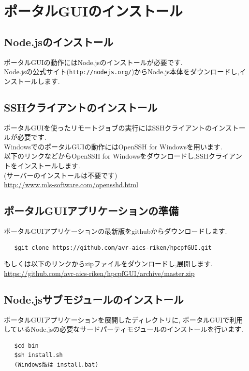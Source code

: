 \documentclass[a4paper,10pt,oneside]{jsbook}
\begin{document}
\section{ポータルGUIのインストール}

\subsection{Node.jsのインストール}
ポータルGUIの動作にはNode.jsのインストールが必要です.\\
Node.jsの公式サイト(\verb+http://nodejs.org/+)からNode.js本体をダウンロードし,インストールします.

\subsection{SSHクライアントのインストール}
ポータルGUIを使ったリモートジョブの実行にはSSHクライアントのインストールが必要です.\\
WindowsでのポータルGUIの動作にはOpenSSH for Windowsを用います.\\
以下のリンクなどからOpenSSH for Windowsをダウンロードし,SSHクライアントをインストールします.\\
(サーバーのインストールは不要です) \\
    \url{http://www.mls-software.com/opensshd.html}

\subsection{ポータルGUIアプリケーションの準備}
ポータルGUIアプリケーションの最新版をgithubからダウンロードします.
\begin{verbatim}
   $git clone https://github.com/avr-aics-riken/hpcpfGUI.git
\end{verbatim}
もしくは以下のリンクからzipファイルをダウンロードし,展開します.\\
	\url{https://github.com/avr-aics-riken/hpcpfGUI/archive/master.zip}

\newpage

\subsection{Node.jsサブモジュールのインストール}
ポータルGUIアプリケーションを展開したディレクトリに,
ポータルGUIで利用しているNode.jsの必要なサードパーティモジュールのインストールを行います.
\begin{verbatim}
   $cd bin
   $sh install.sh 
   (Windows版は install.bat)
\end{verbatim}
\end{document}
